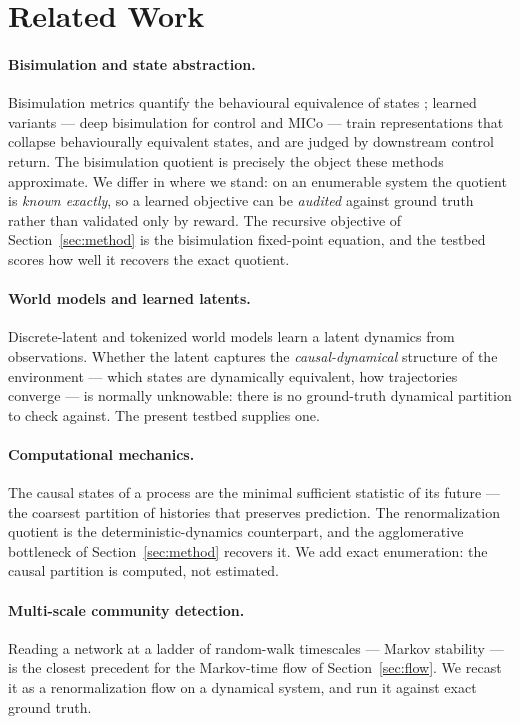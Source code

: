 \documentclass[11pt]{article}
\begin{document}
\section{Related Work}
\label{sec:related}

\paragraph{Bisimulation and state abstraction.}
Bisimulation metrics quantify the behavioural equivalence of states
\citep{ferns2004metrics}; learned variants --- deep bisimulation for control
\citep{zhang2021dbc} and MICo \citep{castro2021mico} --- train representations
that collapse behaviourally equivalent states, and are judged by downstream
control return. The bisimulation quotient is precisely the object these methods
approximate. We differ in where we stand: on an enumerable system the quotient
is \emph{known exactly}, so a learned objective can be \emph{audited} against
ground truth rather than validated only by reward. The recursive objective of
Section~\ref{sec:method} is the bisimulation fixed-point equation, and the
testbed scores how well it recovers the exact quotient.

\paragraph{World models and learned latents.}
Discrete-latent and tokenized world models \citep{vandenoord2017vqvae,
hafner2023dreamerv3} learn a latent dynamics from observations. Whether the
latent captures the \emph{causal-dynamical} structure of the environment ---
which states are dynamically equivalent, how trajectories converge --- is
normally unknowable: there is no ground-truth dynamical partition to check
against. The present testbed supplies one.

\paragraph{Computational mechanics.}
The causal states of a process \citep{crutchfield1989} are the minimal
sufficient statistic of its future --- the coarsest partition of histories that
preserves prediction. The renormalization quotient is the
deterministic-dynamics counterpart, and the agglomerative bottleneck of
Section~\ref{sec:method} recovers it. We add exact enumeration: the causal
partition is computed, not estimated.

\paragraph{Multi-scale community detection.}
Reading a network at a ladder of random-walk timescales --- Markov stability
\citep{delvenne2010stability} --- is the closest precedent for the Markov-time
flow of Section~\ref{sec:flow}. We recast it as a renormalization flow on a
dynamical system, and run it against exact ground truth.
\end{document}
